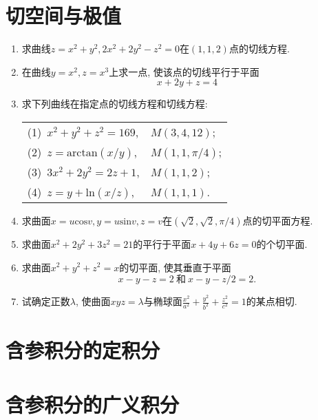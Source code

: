 \section{切空间与极值}
\begin{enumerate}
	\item 求曲线$z = x^2+y^2, 2x^2+2y^2-z^2=0$在$(1,1,2)$点的切线方程.
	\item 在曲线$y=x^2,z=x^3$上求一点, 使该点的切线平行于平面
	$$ x+2y+z = 4$$
	\item 求下列曲线在指定点的切线方程和切线方程:
\begin{table}[H]
	\begin{tabular}{ll}
		\qquad 	(1)\  $x^2+y^2+z^2=169$,\qquad \qquad& $M(3,4,12)$;\\
		\qquad	(2)\  $z=\mathrm{arctan}(x/y)$,\qquad \qquad & $M(1,1,\pi/4)$;\\
		\qquad	(3)\  $3x^2+2y^2=2z+1$, \qquad \qquad \qquad & $M(1,1,2)$;\\
		\qquad	(4)\  $z=y+\mathrm{ln}(x/z)$, \qquad \qquad & $M(1,1,1)$.
	\end{tabular}
\end{table}
\item 求曲面$x=u\mathrm{cos}v, y=u\mathrm{sin}v,z=v$在$(\sqrt{2},\sqrt{2},\pi/4)$点的切平面方程.
\item 求曲面$x^2+2y^2+3z^2=21$的平行于平面$x+4y+6z=0$的个切平面.
\item 求曲面$x^2+y^2+z^2=x$的切平面, 使其垂直于平面
$$ x-y -z = 2\ \text{和}\ x-y-z/2 = 2.$$
\item 试确定正数$\lambda$, 使曲面$xyz=\lambda$与椭球面$\frac{x^2}{a^2}+\frac{y^2}{b^2}+\frac{z^2}{c^2}=1$的某点相切.
\end{enumerate}
\section{含参积分的定积分}

\section{含参积分的广义积分}